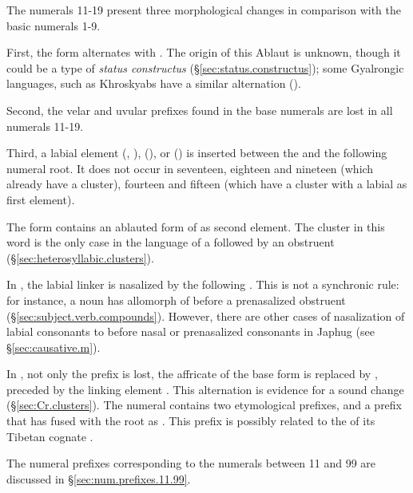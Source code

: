 The numerals 11-19 present three morphological changes in comparison with the basic numerals 1-9.

First, the form  alternates with . The origin of this Ablaut is unknown, though it could be a type of \textit{status constructus} (§\ref{sec:status.constructus}); some Gyalrongic languages, such as Khroskyabs have a similar alternation (\citealt[175--176]{lai17khroskyabs}). 

Second, the velar  and uvular  prefixes found in the base numerals are lost in all numerals 11-19.

Third, a labial element  (, ),  (), or  () is inserted between the  and the following numeral root. It does not occur in seventeen, eighteen and nineteen (which already have a cluster), fourteen and fifteen (which have a cluster with a labial as first element).

The form  contains an ablauted form of  as second element. The cluster  in this word is the only case in the language of a  followed by an obstruent (§\ref{sec:heterosyllabic.clusters}).

In , the labial linker is nasalized by the following . This is not a synchronic rule: for instance, a noun  has  allomorph of  before a prenasalized obstruent (§\ref{sec:subject.verb.compounds}). However, there are other cases of nasalization of labial consonants to  before nasal or prenasalized consonants in Japhug (see §\ref{sec:causative.m}).

In , not only the prefix  is lost, the  affricate of the base form 	 is replaced by , preceded by the linking element . This  \tld{}  alternation is evidence for a sound change  \fl{}  (§\ref{sec:Cr.clusters}).  The numeral  contains two etymological prefixes,  and a prefix  that has fused with the root as . This  prefix is possibly related to the  of its Tibetan cognate   .

The numeral prefixes corresponding to the numerals between 11 and 99 are discussed in §\ref{sec:num.prefixes.11.99}.

